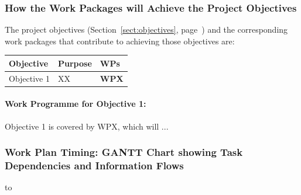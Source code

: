 \documentclass[a4paper,11pt]{article}
\begin{document}
\subsubsection*{How the Work Packages will Achieve the Project Objectives}
\label{sssec:how_the_work_packages_will_achieve}


The project objectives (Section~\ref{sect:objectives},
page~\pageref{sect:objectives}) and the corresponding work
packages that contribute to achieving those objectives are:

\begin{center}
\begin{tabular}{|l|l|l|}\hline
\textbf{Objective} & \textbf{Purpose} & \textbf{WPs} \\\hline \hline
Objective 1 & XX & \textbf{WPX} \\\hline
\end{tabular}
\end{center}

\paragraph*{Work Programme for Objective 1: }

Objective 1 is covered by WPX, which will ...

\landscape

\subsubsection*{Work Plan Timing: GANTT Chart showing Task Dependencies and Information Flows}


\vspace{-0.7in} \centerline{\hbox to \columnwidth{\hss%
\hss}}
\label{fig:gantt}
\vspace{-1in} %
\endlandscape

\newpage

%


\addtocounter{subsubsection}{1}
\fbox{\begin{minipage}{\textwidth}\begin{center}{\Large\bf
        Work package list} %
  \end{center}
  \end{minipage}}
\end{document}
